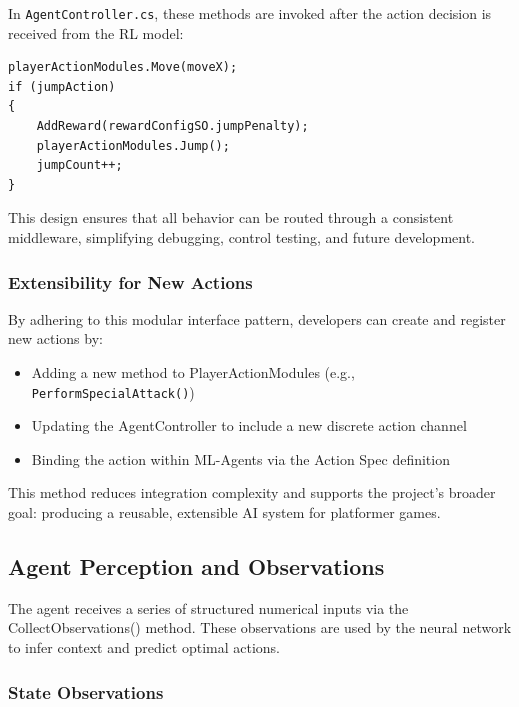 \documentclass[12pt,oneside,openright,a4paper]{cpe-english-project}
\begin{document}
In \texttt{AgentController.cs}, these methods are invoked after the action decision is received from the RL model:
\begin{lstlisting}[language={[Sharp]C}]
playerActionModules.Move(moveX);
if (jumpAction)
{
	AddReward(rewardConfigSO.jumpPenalty);
	playerActionModules.Jump();
	jumpCount++;
}
\end{lstlisting}
This design ensures that all behavior can be routed through a consistent middleware, simplifying debugging, control testing, and future development.

\subsubsection{Extensibility for New Actions}

By adhering to this modular interface pattern, developers can create and register new actions by:

\begin{itemize}
\item Adding a new method to PlayerActionModules (e.g., \texttt{PerformSpecialAttack()})
\item Updating the AgentController to include a new discrete action channel
\item Binding the action within ML-Agents via the Action Spec definition
\end{itemize}

This method reduces integration complexity and supports the project's broader goal: producing a reusable, extensible AI system for platformer games.

\subsection{Agent Perception and Observations}

The agent receives a series of structured numerical inputs via the CollectObservations() method. These observations are used by the neural network to infer context and predict optimal actions.

\subsubsection{State Observations}
\end{document}
